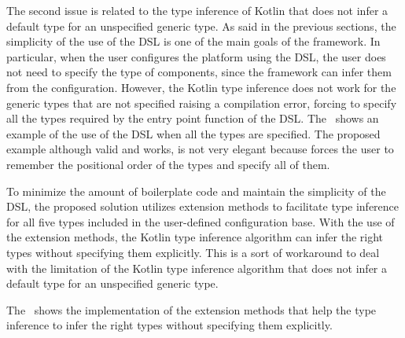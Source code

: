 The second issue is related to the type inference of Kotlin that does not infer a default type for an unspecified generic type.
As said in the previous sections, the simplicity of the use of the DSL is one of the main goals of the framework. In particular, when the user
configures the platform using the DSL, the user does not need to specify the type of components, since the framework can infer them from the
configuration. However, the Kotlin type inference does not work for the generic types that are not specified raising a compilation error, forcing
to specify all the types required by the entry point function of the DSL. The~ shows an example of the use of the
DSL when all the types are specified. The proposed example although valid and works, is not very elegant because forces the user to remember
the positional order of the types and specify all of them.

To minimize the amount of boilerplate code and maintain the simplicity of the DSL, the proposed solution utilizes extension methods to
facilitate type inference for all five types included in the user-defined configuration base.
With the use of the extension methods, the Kotlin type inference algorithm can infer the right types without specifying them explicitly.
This is a sort of workaround to deal with the limitation of the Kotlin type inference algorithm that does not infer a default type for an
unspecified generic type.



The~ shows the implementation of the extension methods that help the type inference to infer the
right types without specifying them explicitly.


